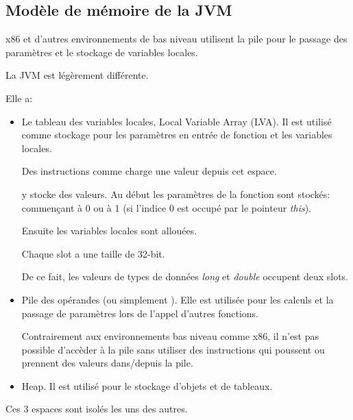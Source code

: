 \subsection{Modèle de mémoire de la \ac{JVM}}

x86 et d'autres environnements de bas niveau utilisent la pile pour le passage des
paramètres et le stockage de variables locales.

La \ac{JVM} est légèrement différente.

Elle a:

\begin{itemize}
\item Le tableau des variables locales, Local Variable Array (\ac{LVA}).
Il est utilisé comme stockage pour les paramètres en entrée de fonction et les variables
locales.

Des instructions comme  charge une valeur depuis cet espace.

 y stocke des valeurs.
Au début les paramètres de la fonction sont stockés: commençant à 0 ou à 1 (si l'indice
0 est occupé par le pointeur \emph{this}).

Ensuite les variables locales sont allouées.


Chaque slot a une taille de 32-bit.

De ce fait, les valeurs de types de données \emph{long} et \emph{double} occupent
deux slots.


\item Pile des opérandes (ou simplement ).
Elle est utilisée pour les calculs et la passage de paramètres lors de l'appel d'autres
fonctions.

Contrairement aux environnements bas niveau comme x86, il n'est pas possible d'accèder
à la pile sans utiliser des instructions qui poussent ou prennent des valeurs dans/depuis
la pile.


\item Heap. Il est utilisé pour le stockage d'objets et de tableaux.

\end{itemize}

Ces 3 espaces sont isolés les uns des autres.

